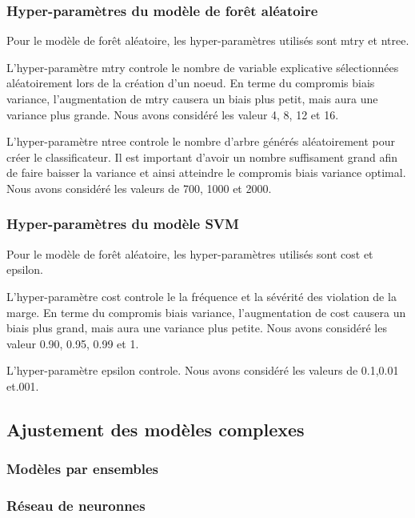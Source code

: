 \subsubsection{Hyper-paramètres du modèle de forêt aléatoire}
Pour le modèle de forêt aléatoire, les hyper-paramètres utilisés sont mtry et ntree. 

L'hyper-paramètre mtry controle le nombre de variable explicative sélectionnées aléatoirement lors de la création d'un noeud.  En terme du compromis biais variance, l'augmentation de mtry causera un biais plus petit, mais aura une variance plus grande.  Nous avons considéré les valeur 4, 8, 12 et 16.

L'hyper-paramètre ntree controle le nombre d'arbre générés aléatoirement pour créer le classificateur. Il est important d'avoir un nombre suffisament grand afin de faire baisser la variance et ainsi atteindre le compromis biais variance optimal. Nous avons considéré les valeurs de 700, 1000 et 2000. 



\subsubsection{Hyper-paramètres du modèle SVM}
Pour le modèle de forêt aléatoire, les hyper-paramètres utilisés sont cost et epsilon. 

L'hyper-paramètre cost controle le la fréquence et la sévérité des violation de la marge.  En terme du compromis biais variance, l'augmentation de cost causera un biais plus grand, mais aura une variance plus petite. Nous avons considéré les valeur 0.90, 0.95, 0.99 et 1.

L'hyper-paramètre epsilon controle. Nous avons considéré les valeurs de 0.1,0.01 et.001. 


\subsection{Ajustement des modèles complexes}

\subsubsection{Modèles par ensembles}

\subsubsection{Réseau de neuronnes}

